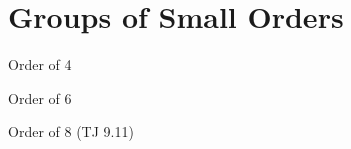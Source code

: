 \section{Groups of Small Orders}

\begin{frame}{Order of 4}
\end{frame}

\begin{frame}{Order of 6}
\end{frame}

\begin{frame}{Order of 8 (TJ 9.11)}
\end{frame}
